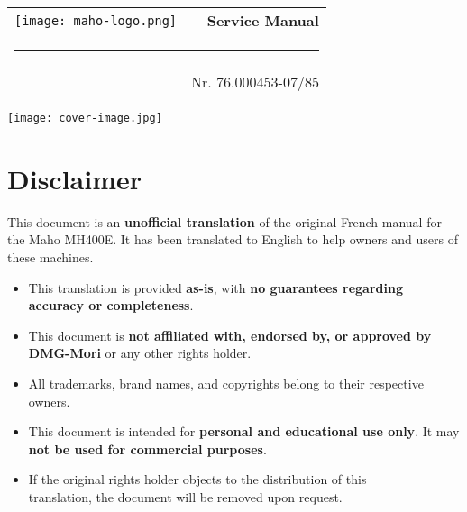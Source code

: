 
\begin{titlepage}
    \vspace*{0cm}

    {\sffamily

        \noindent
        \begin{tabularx}{\textwidth}{X r}
            \texttt{[image: maho-logo.png]} &
            {\Huge \textbf{Service Manual}} \\
            \multicolumn{2}{l}{\rule{\textwidth}{0.4mm}} \\
            & {\normalsize Nr. 76.000453-07/85}
        \end{tabularx}

        \vfill

        \raggedleft
        \hspace{0.2cm} %
        \par %

        \texttt{[image: cover-image.jpg]} 
    }
\end{titlepage}

\newpage

\renewcommand{\thepage}{0.\arabic{page}} %

\section*{Disclaimer}

This document is an \textbf{unofficial translation} of the original French manual for the Maho MH400E. It has been translated to English to help owners and users of these machines.

\begin{itemize}
    \item This translation is provided \textbf{as-is}, with \textbf{no guarantees regarding accuracy or completeness}.
    \item This document is \textbf{not affiliated with, endorsed by, or approved by DMG-Mori} or any other rights holder.
    \item All trademarks, brand names, and copyrights belong to their respective \\owners.
    \item This document is intended for \textbf{personal and educational use only}. It may \textbf{not be used for commercial purposes}.
    \item If the original rights holder objects to the distribution of this \\translation, the document will be removed upon request.
\end{itemize}

